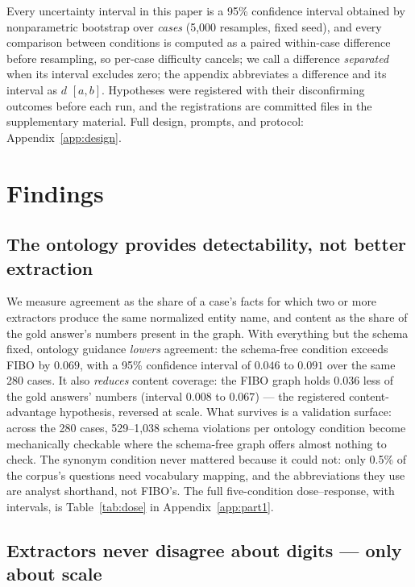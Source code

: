 \documentclass{article}
\begin{document}
Every uncertainty interval in this paper is a 95\% confidence interval
obtained by nonparametric bootstrap over \emph{cases} (5{,}000 resamples,
fixed seed), and every comparison between conditions is computed as a
paired within-case difference before resampling, so per-case difficulty
cancels; we call a difference \emph{separated} when its interval excludes
zero; the appendix abbreviates a difference and its interval as $d$ $[a,b]$. Hypotheses were
registered with their disconfirming outcomes before each run, and the
registrations are committed files in the supplementary material. Full
design, prompts, and protocol: Appendix~\ref{app:design}.

\section{Findings}\label{sec:findings}

\subsection{The ontology provides detectability, not better extraction}

We measure agreement as the share of a case's facts for which two or
more extractors produce the same normalized entity name, and content as
the share of the gold answer's numbers present in the graph. With
everything but the schema fixed, ontology guidance \emph{lowers}
agreement: the schema-free condition exceeds FIBO by $0.069$, with a
95\% confidence interval of $0.046$ to $0.091$ over the same 280 cases.
It also \emph{reduces} content coverage: the FIBO graph holds $0.036$
less of the gold answers' numbers (interval $0.008$ to $0.067$) --- the
registered content-advantage hypothesis, reversed at scale. What survives is a validation surface: across the 280
cases, 529--1{,}038 schema violations per ontology condition become
mechanically checkable where the schema-free graph offers almost nothing to
check. The synonym condition never mattered because it could not: only
0.5\% of the corpus's questions need vocabulary mapping, and the
abbreviations they use are analyst shorthand, not FIBO's. The full
five-condition dose--response, with intervals, is
Table~\ref{tab:dose} in Appendix~\ref{app:part1}.

\subsection{Extractors never disagree about digits --- only about scale}
\end{document}
